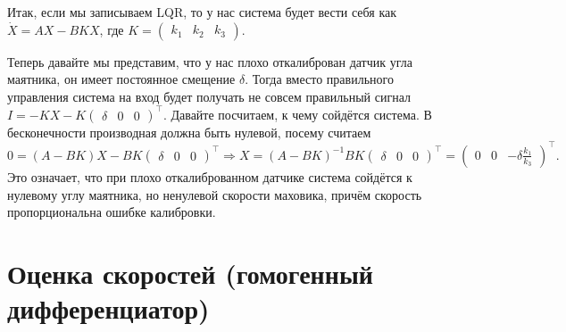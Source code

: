 \documentclass{article}
\begin{document}
Итак, если мы записываем LQR, то у нас система будет вести себя как $\dot X = A X - B K X$, где
$
K= \begin{pmatrix} k_1 & k_2 & k_3 \end{pmatrix}.
$

Теперь давайте мы представим, что у нас плохо откалиброван датчик угла маятника, он имеет постоянное смещение $\delta$. 
Тогда вместо правильного управления система на вход будет получать не совсем правильный сигнал $I=-K X -K \begin{pmatrix} \delta & 0 & 0 \end{pmatrix}^\top$.
Давайте посчитаем, к чему сойдётся система. В бесконечности производная должна быть нулевой, посему считаем
$$
0 = (A-BK)X - BK \begin{pmatrix} \delta & 0 & 0 \end{pmatrix}^\top \Rightarrow X = (A-BK)^{-1}BK\begin{pmatrix} \delta & 0 & 0 \end{pmatrix}^\top = \begin{pmatrix} 0 & 0 & -\delta\frac{k_1}{k_3} \end{pmatrix}^\top.
$$
Это означает, что при плохо откалиброванном датчике система сойдётся к нулевому углу маятника, но ненулевой скорости маховика, причём скорость пропорциональна ошибке калибровки.



\section{Оценка скоростей (гомогенный дифференциатор)}
\end{document}
